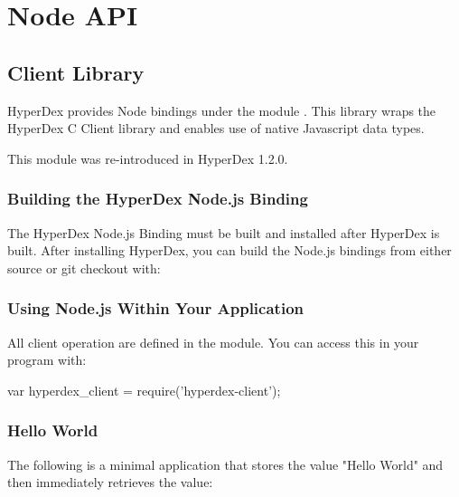 \chapter{Node API}
\label{chap:api:node}

\section{Client Library}
\label{sec:api:node:client}

HyperDex provides Node bindings under the module .  This
library wraps the HyperDex C Client library and enables use of native Javascript
data types.

This module was re-introduced in HyperDex 1.2.0.

\subsection{Building the HyperDex Node.js Binding}
\label{sec:api:node:building}

The HyperDex Node.js Binding must be built and installed after HyperDex is
built.  After installing HyperDex, you can build the Node.js bindings from
either source or git checkout with:

\begin{consolecode}
\end{consolecode}

\subsection{Using Node.js Within Your Application}
\label{sec:api:node:using}

All client operation are defined in the  module.  You can
access this in your program with:

\begin{javascriptcode}
var hyperdex_client = require('hyperdex-client');
\end{javascriptcode}

\subsection{Hello World}
\label{sec:api:node:hello-world}

The following is a minimal application that stores the value "Hello World" and
then immediately retrieves the value:

\inputminted{javascript}{\topdir/api/node.js/hello-world.js}

